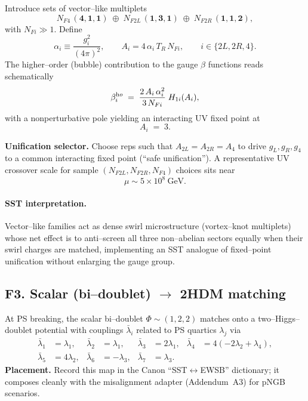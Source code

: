 \documentclass[11pt]{article}
\begin{document}
          Introduce sets of vector–like multiplets
          \[
              N_{F4}\,(\mathbf 4,\mathbf 1,\mathbf 1)\;\oplus\;
              N_{F2L}\,(\mathbf 1,\mathbf 3,\mathbf 1)\;\oplus\;
              N_{F2R}\,(\mathbf 1,\mathbf 1,\mathbf 2),
          \]
          with $N_{Fi}\!\gg\!1$.
          Define
          \begin{equation}
          \alpha_i \equiv \frac{g_i^2}{(4\pi)^2},\qquad
          A_i = 4\,\alpha_i\,T_R\,N_{Fi},\qquad i\in\{2L,2R,4\}.
          \end{equation}
          The higher–order (bubble) contribution to the gauge $\beta$ functions reads schematically
          \begin{equation}
          \beta_i^{\textrm ho} \;=\; \frac{2\,A_i\,\alpha_i^2}{3\,N_{Fi}}\;H_{1i}(A_i),
          \end{equation}
          with a nonperturbative pole yielding an interacting UV fixed point at
          \begin{equation}
          A_i \;=\; 3.
          \end{equation}

          \textbf{Unification selector.} \; Choose reps such that $A_{2L}=A_{2R}=A_4$ to drive $g_L,g_R,g_4$ to a common interacting fixed point (“safe unification”). A representative UV crossover scale for sample $(N_{F2L},N_{F2R},N_{F4})$ choices sits near
          \[
              \mu \sim 5\times10^{8}\ \mathrm{GeV}.
          \]

          \paragraph{SST interpretation.}
              Vector–like families act as dense swirl microstructure (vortex–knot multiplets) whose net effect is to anti–screen all three non–abelian sectors equally when their swirl charges are matched, implementing an SST analogue of fixed–point unification without enlarging the gauge group.

  \subsection*{F3. Scalar (bi–doublet) $\to$ 2HDM matching}

      At PS breaking, the scalar bi–doublet $\Phi\sim(1,2,2)$ matches onto a two–Higgs–doublet potential with couplings $\bar\lambda_i$ related to PS quartics $\lambda_j$ via
      \begin{align}
      \bar\lambda_1&=\lambda_1, & \bar\lambda_2&=\lambda_1, &
      \bar\lambda_3&=2\lambda_1, & \bar\lambda_4&=4(-2\lambda_2+\lambda_4),\\
      \bar\lambda_5&=4\lambda_2, & \bar\lambda_6&=-\lambda_3, &
      \bar\lambda_7&=\lambda_3. &&
      \end{align}
      \textbf{Placement.} Record this map in the Canon “SST$\leftrightarrow$EWSB” dictionary; it composes cleanly with the misalignment adapter (Addendum~A3) for pNGB scenarios.
\end{document}
